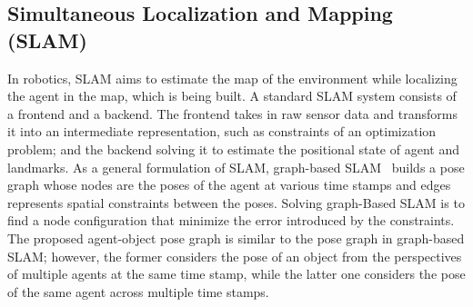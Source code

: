 \documentclass[letterpaper, 10 pt, conference]{ieeeconf}  %
\makeatletter
\newcommand{\Note}[1]{{\color{blue} \bf \small [NOTE: #1]}}
\newcommand{\etal}{{et al}.\@ }
\makeatother
\begin{document}
\subsection{Simultaneous Localization and Mapping (SLAM)}
In robotics, SLAM\cite{taketomi2017visual,aulinas2008slam,saputra2018visual,zou2019collaborative} aims to estimate the map of the environment while localizing the agent in the map, which is being built. A standard SLAM system consists of a frontend and a backend. The frontend takes in raw sensor data and transforms it into an intermediate representation, such as constraints of an optimization problem; and the backend solving it to estimate the positional state of agent and landmarks. As a general formulation of SLAM, graph-based SLAM~\cite{lu1997globally,grisetti2010tutorial} builds a pose graph whose nodes are the poses of the agent at various time stamps and edges represents spatial constraints between the poses. Solving graph-Based SLAM is to find a node configuration that minimize the error introduced by the constraints.  The proposed agent-object pose graph is similar to the pose graph in graph-based SLAM; however, the former considers the pose of an object from the perspectives of multiple agents at the same time stamp, while the latter one considers the pose of the same agent across multiple time stamps.







\end{document}

